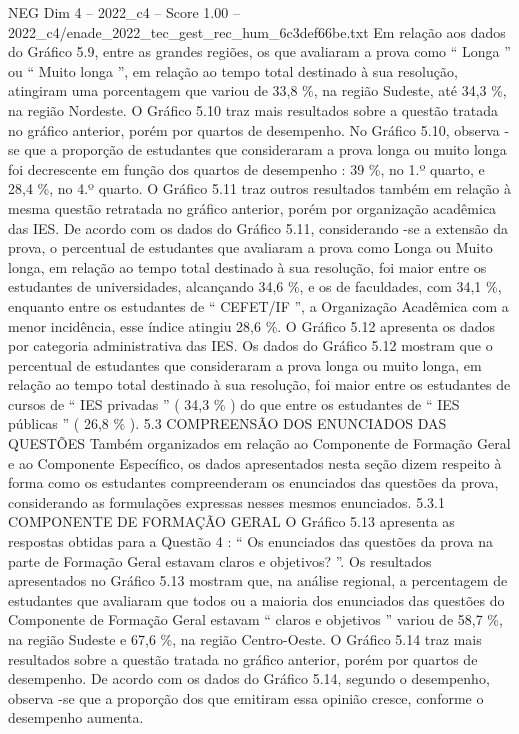 \begin{textsample}{NEG Dim 4 – 2022\_c4 – Score 1.00 – 2022\_c4/enade\_2022\_tec\_gest\_rec\_hum\_6c3def66be.txt}
Em relação aos dados do Gráfico 5.9, entre as grandes regiões, os que avaliaram a prova como “ Longa ” ou “ Muito longa ”, em relação ao tempo total destinado à sua resolução, atingiram uma porcentagem que variou de 33,8 \%, na região Sudeste, até 34,3 \%, na região Nordeste.
O Gráfico 5.10 traz mais resultados sobre a questão tratada no gráfico anterior, porém por quartos de desempenho.
No Gráfico 5.10, observa -se que a proporção de estudantes que consideraram a prova longa ou muito longa foi decrescente em função dos quartos de desempenho : 39 \%, no 1.º quarto, e 28,4 \%, no 4.º quarto.
O Gráfico 5.11 traz outros resultados também em relação à mesma questão retratada no gráfico anterior, porém por organização acadêmica das IES.
De acordo com os dados do Gráfico 5.11, considerando -se a extensão da prova, o percentual de estudantes que avaliaram a prova como Longa ou Muito longa, em relação ao tempo total destinado à sua resolução, foi maior entre os estudantes de universidades, alcançando 34,6 \%, e os de faculdades, com 34,1 \%, enquanto entre os estudantes de “ CEFET/IF ”, a Organização Acadêmica com a menor incidência, esse índice atingiu 28,6 \%.
O Gráfico 5.12 apresenta os dados por categoria administrativa das IES.
Os dados do Gráfico 5.12 mostram que o percentual de estudantes que consideraram a prova longa ou muito longa, em relação ao tempo total destinado à sua resolução, foi maior entre os estudantes de cursos de “ IES privadas ” ( 34,3 \% ) do que entre os estudantes de “ IES públicas ” ( 26,8 \% ). 5.3 COMPREENSÃO DOS ENUNCIADOS DAS QUESTÕES Também organizados em relação ao Componente de Formação Geral e ao Componente Específico, os dados apresentados nesta seção dizem respeito à forma como os estudantes compreenderam os enunciados das questões da prova, considerando as formulações expressas nesses mesmos enunciados. 5.3.1 COMPONENTE DE FORMAÇÃO GERAL O Gráfico 5.13 apresenta as respostas obtidas para a Questão 4 : “ Os enunciados das questões da prova na parte de Formação Geral estavam claros e objetivos? ”.
Os resultados apresentados no Gráfico 5.13 mostram que, na análise regional, a percentagem de estudantes que avaliaram que todos ou a maioria dos enunciados das questões do Componente de Formação Geral estavam “ claros e objetivos ” variou de 58,7 \%, na região Sudeste e 67,6 \%, na região Centro-Oeste.
O Gráfico 5.14 traz mais resultados sobre a questão tratada no gráfico anterior, porém por quartos de desempenho.
De acordo com os dados do Gráfico 5.14, segundo o desempenho, observa -se que a proporção dos que emitiram essa opinião cresce, conforme o desempenho aumenta.

\end{textsample}
